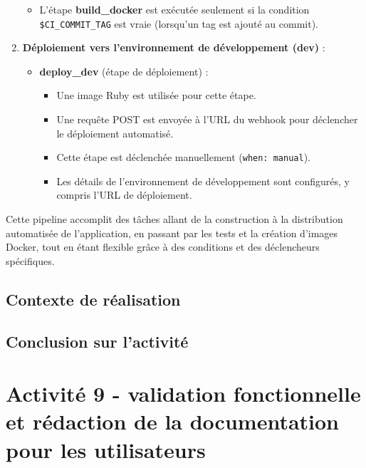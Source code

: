 \documentclass[a4paper, 11pt]{report}
\begin{document}
\begin{enumerate}
  \begin{itemize}
  \tightlist
  \item
    L'étape \textbf{build\_docker} est exécutée seulement si la
    condition \texttt{\$CI\_COMMIT\_TAG} est vraie (lorsqu'un tag est
    ajouté au commit).
  \end{itemize}
\item
  \textbf{Déploiement vers l'environnement de développement (dev)} :

  \begin{itemize}
  \tightlist
  \item
    \textbf{deploy\_dev} (étape de déploiement) :

    \begin{itemize}
    \tightlist
    \item
      Une image Ruby est utilisée pour cette étape.
    \item
      Une requête POST est envoyée à l'URL du webhook pour déclencher le
      déploiement automatisé.
    \item
      Cette étape est déclenchée manuellement (\texttt{when:\ manual}).
    \item
      Les détails de l'environnement de développement sont configurés, y
      compris l'URL de déploiement.
    \end{itemize}
  \end{itemize}
\end{enumerate}

Cette pipeline accomplit des tâches allant de la construction à la
distribution automatisée de l'application, en passant par les tests et
la création d'images Docker, tout en étant flexible grâce à des
conditions et des déclencheurs spécifiques.
\subsection{Contexte de réalisation}
\subsection{Conclusion sur l'activité}

\section{Activité 9 - validation fonctionnelle et rédaction de la documentation pour les utilisateurs}
\end{document}
